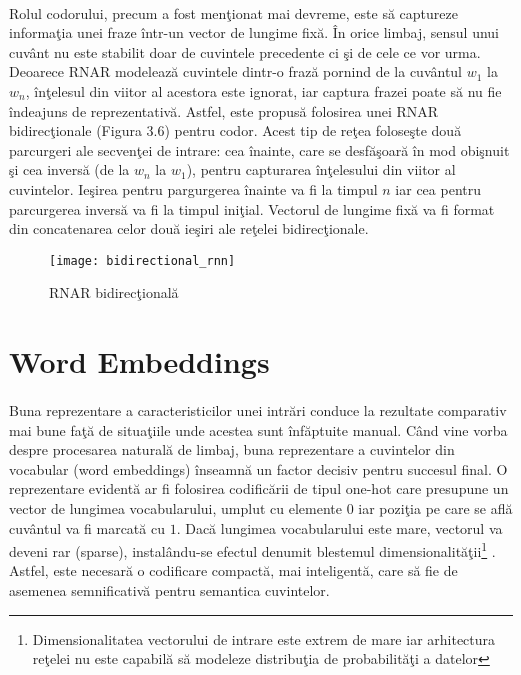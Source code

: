 \paragraph{}
Rolul codorului, precum a fost men\c tionat mai devreme, este s\u a captureze informa\c tia unei fraze \^ intr-un vector de lungime fix\u a. \^ In orice limbaj, sensul unui cuv\^ ant nu este stabilit doar de cuvintele precedente ci \c si de cele ce vor urma. Deoarece RNAR modeleaz\u a cuvintele dintr-o fraz\u a pornind de la cuv\^ antul \(w_{1}\) la \(w_{n}\), \^ in\c telesul din viitor al acestora este ignorat, iar captura frazei poate s\u a nu fie \^ indeajuns de reprezentativ\u a. Astfel, este propus\u a folosirea unei RNAR bidirec\c tionale \cite{Schuster:1997:BRN:2198065.2205129} (Figura 3.6) pentru codor. Acest tip de re\c tea folose\c ste dou\u a parcurgeri ale secven\c tei de intrare: cea \^ inainte, care se desf\u a\c soar\u a \^ in mod obi\c snuit \c si cea invers\u a (de la \(w_{n}\) la \(w_{1}\)), pentru capturarea \^ in\c telesului din viitor al cuvintelor. Ie\c sirea pentru pargurgerea \^ inainte va fi la timpul \(n\) iar cea pentru parcurgerea invers\u a va fi la timpul ini\c tial. Vectorul de lungime fix\u a va fi format din concatenarea celor dou\u a ie\c siri ale re\c telei bidirec\c tionale.

\begin{figure}[H]
\centering
\texttt{[image: bidirectional\_rnn]}
\caption{RNAR bidirec\c tional\u a}
\end{figure} 

\section{Word Embeddings}

\paragraph{}
Buna reprezentare a caracteristicilor unei intr\u ari conduce la rezultate comparativ mai bune fa\c t\u a de situa\c tiile unde acestea sunt \^ inf\u aptuite manual. C\^ and vine vorba despre procesarea natural\u a de limbaj, buna reprezentare a cuvintelor din vocabular (word embeddings) \^ inseamn\u a un factor decisiv pentru succesul final. O reprezentare evident\u a ar fi folosirea codific\u arii de tipul one-hot care presupune un vector de lungimea vocabularului, umplut cu elemente \(0\) iar pozi\c tia pe care se afl\u a cuv\^ antul va fi marcat\u a cu \(1\). Dac\u a lungimea vocabularului este mare, vectorul va deveni rar (sparse), instal\^ andu-se efectul denumit blestemul dimensionalit\u a\c tii\footnote{Dimensionalitatea vectorului de intrare este extrem de mare iar arhitectura re\c telei nu este capabil\u a s\u a modeleze distribu\c tia de probabilit\u a\c ti a datelor} \cite{doi:10.1093/imamat/24.1.59}. Astfel, este necesar\u a o codificare compact\u a, mai inteligent\u a, care s\u a fie de asemenea semnificativ\u a pentru semantica cuvintelor.

